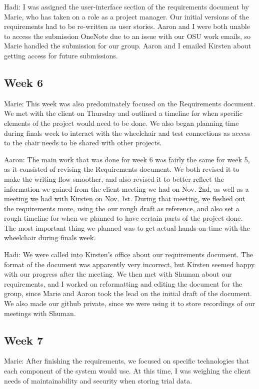 \documentclass[onecolumn, draftclsnofoot,10pt, compsoc]{IEEEtran}
\begin{document}
Hadi: I was assigned the user-interface section of the requirements document by Marie, who has taken on a role as a project manager. Our initial versions of the requirements had to be re-written as user stories. Aaron and I were both unable to access the submission OneNote due to an issue with our OSU work emails, so Marie handled the submission for our group. Aaron and I emailed Kirsten about getting access for future submissions.\par

\subsection{Week 6}
Marie: This week was also predominately focused on the Requirements document. We met with the client on Thursday and outlined a timeline for when specific elements of the project would need to be done. We also began planning time during finals week to interact with the wheelchair and test connections as access to the chair needs to be shared with other projects.\par

Aaron: The main work that was done for week 6 was fairly the same for week 5, as it consisted of revising the Requirements document. We both revised it to make the writing flow smoother, and also revised it to better reflect the information we gained from the client meeting we had on Nov. 2nd, as well as a meeting we had with Kirsten on Nov. 1st. During that meeting, we fleshed out the requirements more, using the our rough draft as reference, and also set a rough timeline for when we planned to have certain parts of the project done. The most important thing we planned was to get actual hands-on time with the wheelchair during finals week.\par

Hadi: We were called into Kirsten's office about our requirements document. The format of the document was apparently very incorrect, but Kirsten seemed happy with our progress after the meeting. We then met with Shuman about our requirements, and I worked on reformatting and editing the document for the group, since Marie and Aaron took the lead on the initial draft of the document. We also made our github private, since we were using it to store recordings of our meetings with Shuman.\par

\subsection{Week 7}
Marie: After finishing the requirements, we focused on specific technologies that each component of the system would use. At this time, I was weighing the client needs of maintainability and security when storing trial data.\par
\end{document}
